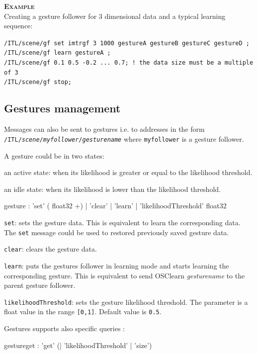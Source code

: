 \documentclass[a4paper,twoside]{report}
\newcommand{\subsublevel}[1]	{\subsection{#1}}
\newcommand{\OSC}[1]		{\texttt{#1}}
\newcommand{\values}[1]		{\texttt{#1}}
\newcommand{\example}		{\textbf{\hspace{-1.5cm}\textbf{\textsc{Example }}}}
\let\olditemize\itemize
\let\oldenditemize\enditemize
\renewenvironment{itemize} 	{\olditemize \setlength{\itemsep}{1mm}}{\oldenditemize}
\newcommand{\sample}	[1]			{\vspace{-2mm}\begin{center}\colorbox{mygrey}{
								\begin{minipage}[t]{0.9\columnwidth} 
								{\small \texttt{#1}}
								\end{minipage}}\end{center}}
\begin{document}
\example \\
Creating a gesture follower for 3 dimensional data and a typical learning sequence:
\sample{/ITL/scene/gf set imtrgf 3 1000 gestureA gestureB gestureC gestureD ;\\
/ITL/scene/gf learn gestureA ;\\
/ITL/scene/gf 0.1 0.5 -0.2 ... 0.7; ! the data size must be a multiple of 3\\
/ITL/scene/gf stop;
}

\subsublevel{Gestures management}\label{gfgestures}

Messages can also be sent to gestures i.e. to addresses in the form \OSC{/ITL/\textit{scene}/\textit{myfollower}/\textit{gesturename}} where \OSC{myfollower} is a gesture follower.

A gesture could be in two states:
\begin{itemize}
\item an active state: when its likelihood is greater or equal to the likelihood threshold.
\item an idle state: when its likelihood is lower than the likelihood threshold.
\end{itemize}

\begin{rail}
gesture : 'set' ( float32 +)
		| 'clear'
		| 'learn'
 		| 'likelihoodThreshold' float32
\end{rail}


\begin{itemize}
\item \OSC{set}: sets the gesture data. This is equivalent to learn the corresponding data. The \OSC{set} message could be used to restored previously saved gesture data.
\item \OSC{clear}: clears the gesture data. 
\item \OSC{learn}: puts the gestures follower in learning mode and starts learning the corresponding gesture. This is equivalent to send OSC{learn \textit{gesturename}} to the parent gesture follower.
\item \OSC{likelihoodThreshold}: sets the gesture likelihood threshold. The parameter is a float value in the range \values{[0,1]}. Default value is \values{0.5}.
\end{itemize}

Gestures supports also specific queries :
\begin{rail}
gestureget : 'get' (| 'likelihoodThreshold' | 'size')
\end{rail}
\end{document}
